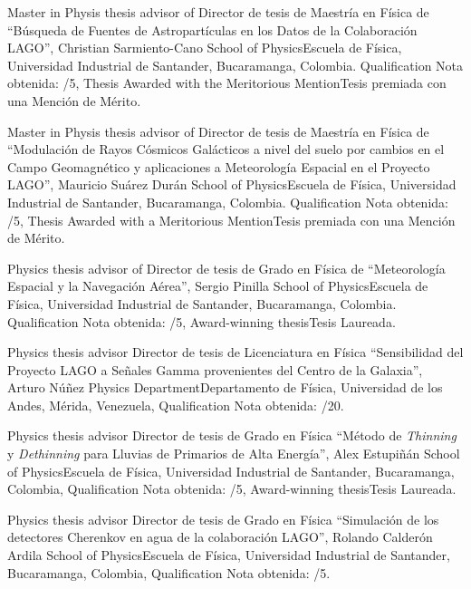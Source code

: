 \ifeng
Master in Physis thesis advisor of
 \else
Director de tesis de Maestría en Física de
 \fi
``Búsqueda de Fuentes de Astropartículas en los Datos de la Colaboración LAGO'', Christian Sarmiento-Cano \at \ifeng School of Physics\else Escuela de Física\fi, Universidad Industrial de Santander, Bucaramanga, Colombia. \ifeng Qualification \else Nota obtenida: /5, \ifeng Thesis Awarded with the Meritorious Mention\else Tesis premiada con una Mención de Mérito\fi.

\ifeng
Master in Physis thesis advisor of
 \else
Director de tesis de Maestría en Física de
 \fi
``Modulación de Rayos Cósmicos Galácticos a nivel del suelo por cambios en el Campo Geomagnético y aplicaciones a Meteorología Espacial en el Proyecto LAGO'', Mauricio Suárez Durán \at \ifeng School of Physics\else Escuela de Física\fi, Universidad Industrial de Santander, Bucaramanga, Colombia. \ifeng Qualification \else Nota obtenida: /5, \ifeng Thesis Awarded with a Meritorious Mention\else Tesis premiada con una Mención de Mérito\fi.

\ifeng
Physics thesis advisor of
 \else
Director de tesis de Grado en Física de
 \fi
``Meteorología Espacial y la Navegación Aérea'', Sergio Pinilla \at \ifeng School of Physics\else Escuela de Física\fi, Universidad Industrial de Santander, Bucaramanga, Colombia.  \ifeng Qualification \else Nota obtenida: /5, \ifeng Award-winning thesis\else Tesis Laureada\fi.

\ifeng
Physics thesis advisor
 \else
Director de tesis de Licenciatura en Física
 \fi
``Sensibilidad del Proyecto LAGO a Señales Gamma provenientes del Centro de la Galaxia'', Arturo Núñez \at \ifeng Physics Department\else Departamento de Física\fi, Universidad de los Andes, Mérida, Venezuela, \ifeng Qualification \else Nota obtenida: /20.

\ifeng
Physics thesis advisor
 \else
Director de tesis de Grado en Física
 \fi
``Método de {\textit{Thinning}} y {\textit{Dethinning}} para Lluvias de Primarios de Alta Energía'', Alex Estupiñán \at \ifeng School of Physics\else Escuela de Física\fi, Universidad Industrial de Santander, Bucaramanga, Colombia, \ifeng Qualification \else Nota obtenida: /5, \ifeng Award-winning thesis\else Tesis Laureada\fi.

\ifeng
Physics thesis advisor
 \else
Director de tesis de Grado en Física
 \fi
``Simulación de los detectores Cherenkov en agua de la colaboración LAGO'', Rolando Calderón Ardila \at \ifeng School of Physics\else Escuela de Física\fi, Universidad Industrial de Santander, Bucaramanga, Colombia, \ifeng Qualification \else Nota obtenida: /5. 

